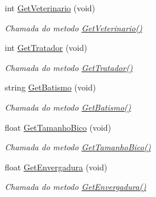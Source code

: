 \begin{DoxyCompactItemize}
int \mbox{\hyperlink{class_ave_aad85251d6f3411c8d4f6ba0a099acf90}{Get\+Veterinario}} (void)
\begin{DoxyCompactList}\small\item\em Chamada do metodo \mbox{\hyperlink{class_ave_aad85251d6f3411c8d4f6ba0a099acf90}{Get\+Veterinario()}} \end{DoxyCompactList}\item 
\mbox{\label{class_ave_ac205b0f275e6647ad7ad4abbcb323912}} 
int \mbox{\hyperlink{class_ave_ac205b0f275e6647ad7ad4abbcb323912}{Get\+Tratador}} (void)
\begin{DoxyCompactList}\small\item\em Chamada do metodo \mbox{\hyperlink{class_ave_ac205b0f275e6647ad7ad4abbcb323912}{Get\+Tratador()}} \end{DoxyCompactList}\item 
\mbox{\label{class_ave_af6ff1f6baf664ffefa121372a3830f4f}} 
string \mbox{\hyperlink{class_ave_af6ff1f6baf664ffefa121372a3830f4f}{Get\+Batismo}} (void)
\begin{DoxyCompactList}\small\item\em Chamada do metodo \mbox{\hyperlink{class_ave_af6ff1f6baf664ffefa121372a3830f4f}{Get\+Batismo()}} \end{DoxyCompactList}\item 
\mbox{\label{class_ave_a2b2b43698ae468b9bb1c64174064313e}} 
float \mbox{\hyperlink{class_ave_a2b2b43698ae468b9bb1c64174064313e}{Get\+Tamanho\+Bico}} (void)
\begin{DoxyCompactList}\small\item\em Chamada do metodo \mbox{\hyperlink{class_ave_a2b2b43698ae468b9bb1c64174064313e}{Get\+Tamanho\+Bico()}} \end{DoxyCompactList}\item 
\mbox{\label{class_ave_a91103e0a19d277bdd0b8fd41e86618ed}} 
float \mbox{\hyperlink{class_ave_a91103e0a19d277bdd0b8fd41e86618ed}{Get\+Envergadura}} (void)
\begin{DoxyCompactList}\small\item\em Chamada do metodo \mbox{\hyperlink{class_ave_a91103e0a19d277bdd0b8fd41e86618ed}{Get\+Envergadura()}} \end{DoxyCompactList}\end{DoxyCompactItemize}
